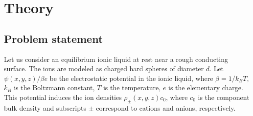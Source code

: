 
\section{Theory}
\label{sec:model}
\subsection{Problem statement}
\label{sec:setup}

Let us consider an equilibrium   ionic liquid at rest near a rough conducting surface. The ions are modeled as charged hard spheres of diameter $d$.
Let $\psi(x,y,z)/\beta e$ be the electrostatic potential in the ionic liquid,
where $\beta=1/k_B T$, $k_B$ is the Boltzmann constant, $T$ is the temperature, $e$ is the elementary charge. This potential induces the ion densities $\rho_\pm(x,y,z)c_0$, where $c_0$ is the component bulk density and subscripts $\pm$ correspond to cations and anions, respectively.

